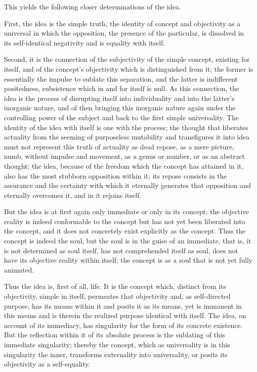 This yields the following closer determinations of the idea.

First, the idea is the simple truth,
the identity of concept and objectivity as a
universal in which the opposition,
the presence of the particular,
is dissolved in its self-identical negativity
and is equality with itself.

Second, it is the connection of
the subjectivity of the simple concept, existing for itself,
and of the concept's objectivity which is distinguished from it;
the former is essentially the impulse to sublate this separation,
and the latter is indifferent positedness,
subsistence which in and for itself is null.
As this connection, the idea is
the process of disrupting itself into individuality
and into the latter's inorganic nature,
and of then bringing this inorganic nature again
under the controlling power of the subject
and back to the first simple universality.
The identity of the idea with itself is one with the process;
the thought that liberates actuality from
the seeming of purposeless mutability
and transfigures it into idea
must not represent this truth of actuality
as dead repose, as a mere picture, numb, without impulse and movement,
as a genus or number, or as an abstract thought;
the idea, because of the freedom which the concept has attained in it,
also has the most stubborn opposition within it;
its repose consists in the assurance and the certainty
with which it eternally generates that opposition
and eternally overcomes it, and in it rejoins itself.

But the idea is at first again only immediate or only in its concept;
the objective reality is indeed conformable to the concept
but has not yet been liberated into the concept,
and it does not concretely exist explicitly as the concept.
Thus the concept is indeed the soul,
but the soul is in the guise of an immediate,
that is, it is not determined as soul itself,
has not comprehended itself as soul,
does not have its objective reality within itself;
the concept is as a soul that is not yet fully animated.

Thus the idea is, first of all, life.
It is the concept which, distinct from its objectivity,
simple in itself, permeates that objectivity
and, as self-directed purpose, has its means within it
and posits it as its means, yet is immanent in this means
and is therein the realized purpose identical with itself.
The idea, on account of its immediacy, has singularity
for the form of its concrete existence.
But the reflection within it of its absolute process is
the sublating of this immediate singularity;
thereby the concept, which as universality is
in this singularity the inner,
transforms externality into universality,
or posits its objectivity as a self-equality.

